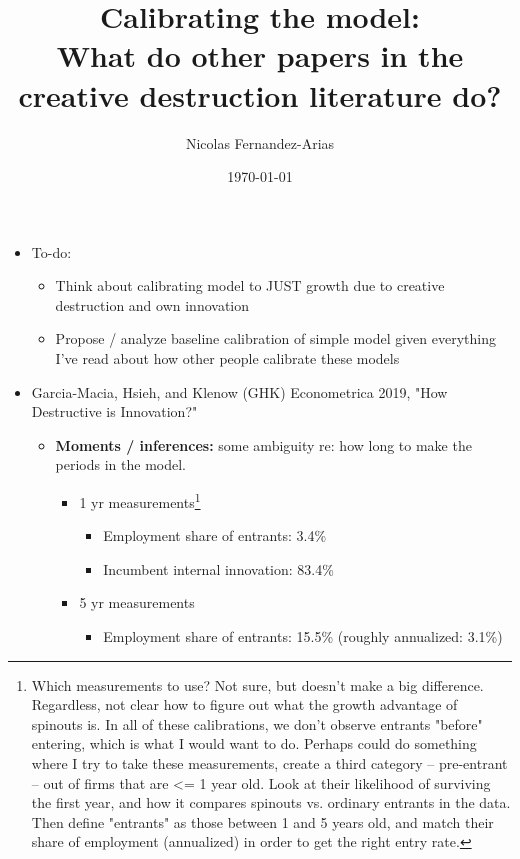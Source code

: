 \documentclass[12pt,english]{article}
\theoremstyle{remark}
\begin{document}
	
\title{Calibrating the model: \\ What do other papers in the creative destruction literature do?}
\author{Nicolas Fernandez-Arias}
\date{\today}
\maketitle

\begin{itemize}
	\item To-do:
	\begin{itemize}
		\item Think about calibrating model to JUST growth due to creative destruction and own innovation
		\item Propose / analyze baseline calibration of simple model given everything I've read about how other people calibrate these models
	\end{itemize}
	\item Garcia-Macia, Hsieh, and Klenow (GHK) Econometrica 2019, "How Destructive is Innovation?"
	\begin{itemize}
		\item \textbf{Moments / inferences:} some ambiguity re: how long to make the periods in the model.
		\begin{itemize}
				\item 1 yr measurements\footnote{Which measurements to use? Not sure, but doesn't make a big difference. Regardless, not clear how to figure out what the growth advantage of spinouts is. In all of these calibrations, we don't observe entrants "before" entering, which is what I would want to do. Perhaps could do something where I try to take these measurements, create a third category -- pre-entrant -- out of firms that are <= 1 year old. Look at their likelihood of surviving the first year, and how it compares spinouts vs. ordinary entrants in the data. Then define "entrants" as those between 1 and 5 years old, and match their share of employment (annualized) in order to get the right entry rate.}
			\begin{itemize}
				\item Employment share of entrants: 3.4\%
				\item Incumbent internal innovation: 83.4\%
			\end{itemize}
			\item 5 yr measurements
			\begin{itemize}
				\item Employment share of entrants: 15.5\% (roughly annualized: 3.1\%)

\end{itemize}
\end{itemize}
\end{itemize}
\end{itemize}
\end{document}
